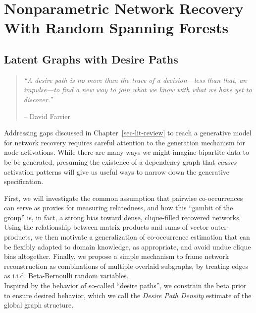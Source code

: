 \documentclass[%
	12pt,
		oneside,
		letterpaper
]{book}
\begin{document}
\part{Nonparametric Network Recovery With Random Spanning Forests}

\chapter{Latent Graphs with Desire Paths}\label{sec-desirepath}

\begin{flushright}

\begin{minipage}{.7\linewidth}

\singlespacing

\begin{quote}
\emph{``A desire path is no more than the trace of a decision---less
than that, an impulse---to find a new way to join what we know with what
we have yet to discover.''}

\hfill -- David Farrier\\
\doublespacing
\end{quote}

\end{minipage}

\end{flushright}

Addressing gaps discussed in Chapter~\ref{sec-lit-review} to reach a
generative model for network recovery requires careful attention to the
generation mechanism for node activations. While there are many ways we
might imagine bipartite data to be be generated, presuming the existence
of a dependency graph that \emph{causes} activation patterns will give
us useful ways to narrow down the generative specification.

First, we will investigate the common assumption that pairwise
co-occurrences can serve as proxies for measuring relatedness, and how
this ``gambit of the group'' is, in fact, a strong bias toward dense,
clique-filled recovered networks. Using the relationship between matrix
products and sums of vector outer-products, we then motivate a
generalization of co-occurrence estimation that can be flexibly adapted
to domain knowledge, as appropriate, and avoid undue clique bias
altogether. Finally, we propose a simple mechanism to frame network
reconstruction as combinations of multiple overlaid subgraphs, by
treating edges as i.i.d. Beta-Bernoulli random variables.\\
Inspired by the behavior of so-called ``desire paths'', we constrain the
beta prior to ensure desired behavior, which we call the \emph{Desire
Path Density} estimate of the global graph structure.
\end{document}

